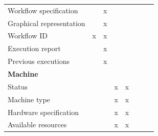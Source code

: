 \begin{table}[htbp]
{\begin{tabular}{lccccccc}
            Workflow specification              &                   & x                             &                          &                     &                         &                           &                           \\
            Graphical representation            &                   & x                             &                          &                     &                         &                           &                           \\
            Workflow ID                         & x                 & x                             &                          &                     &                         &                           &                           \\
            Execution report                    &                   & x                             &                          &                     &                         &                           &                           \\
            Previous executions                 &                   & x                             &                          &                     &                         &                           &                           \\
            \midrule
            \multicolumn{8}{l}{\textbf{Machine}}                                                                                                                                                                                       \\[3pt]
            Status                              &                   &                               & x                        & x                   &                         &                           &                           \\
            Machine type                        &                   &                               & x                        & x                   &                         &                           &                           \\
            Hardware specification              &                   &                               & x                        & x                   &                         &                           &                           \\
            Available resources                 &                   &                               & x                        & x                   &                         &                           &                           \\

\end{tabular}}
\end{table}
